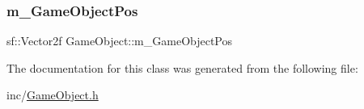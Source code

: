 \subsubsection{\texorpdfstring{m\+\_\+\+Game\+Object\+Pos}{m\_GameObjectPos}}
{\footnotesize\ttfamily sf\+::\+Vector2f Game\+Object\+::m\+\_\+\+Game\+Object\+Pos\hspace{0.3cm}{\ttfamily [protected]}}



The documentation for this class was generated from the following file\+:\begin{DoxyCompactItemize}
\item 
inc/\mbox{\hyperlink{_game_object_8h}{Game\+Object.\+h}}\end{DoxyCompactItemize}
